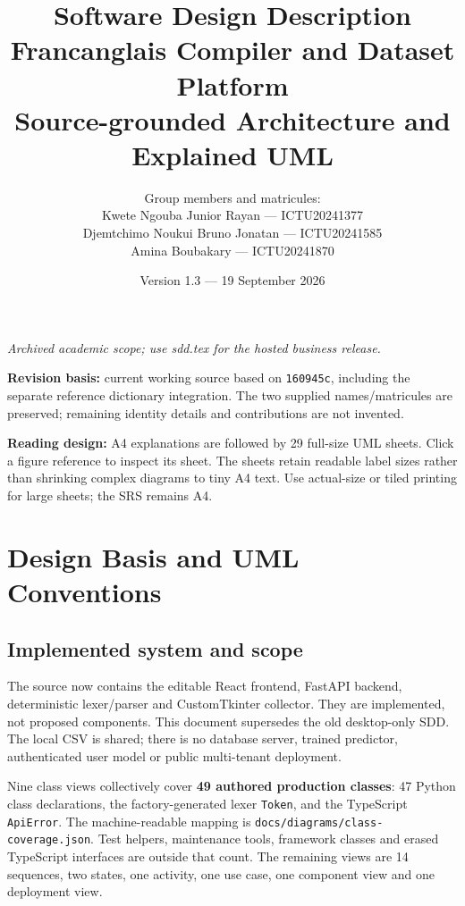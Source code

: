 \documentclass[11pt,a4paper]{article}
\title{\textbf{Software Design Description}\\[0.4em]
\Large Francanglais Compiler and Dataset Platform\\[0.6em]
\large Source-grounded Architecture and Explained UML}
\author{Group members and matricules:\\[0.6em]
Kwete Ngouba Junior Rayan --- ICTU20241377\\[0.5em]
Djemtchimo Noukui Bruno Jonatan --- ICTU20241585\\[0.5em]
Amina Boubakary --- ICTU20241870}
\date{Version 1.3 --- 19 September 2026}
\begin{document}
\maketitle\thispagestyle{empty}
\begin{center}\textit{Archived academic scope; use sdd.tex for the hosted business release.}\end{center}
\vfill
\noindent\textbf{Revision basis:} current working source based on
\nolinkurl{160945c}, including the separate reference dictionary integration.
The two supplied names/matricules are preserved; remaining identity details
and contributions are not invented.
\par\medskip
\noindent\textbf{Reading design:} A4 explanations are followed by 29 full-size
UML sheets. Click a figure reference to inspect its sheet. The sheets retain
readable label sizes rather than shrinking complex diagrams to tiny A4 text.
Use actual-size or tiled printing for large sheets; the SRS remains A4.
\newpage\tableofcontents\newpage\listoffigures\newpage

\section{Design Basis and UML Conventions}
\subsection{Implemented system and scope}
The source now contains the editable React frontend, FastAPI backend,
deterministic lexer/parser and CustomTkinter collector. They are implemented,
not proposed components. This document supersedes the old desktop-only SDD.
The local CSV is shared; there is no database server, trained predictor,
authenticated user model or public multi-tenant deployment.

Nine class views collectively cover \textbf{49 authored production classes}:
47 Python class declarations, the factory-generated lexer \texttt{Token}, and
the TypeScript \texttt{ApiError}. The machine-readable mapping is
\nolinkurl{docs/diagrams/class-coverage.json}. Test helpers, maintenance tools,
framework classes and erased TypeScript interfaces are outside that count.
The remaining views are 14 sequences, two states, one activity, one use case,
one component view and one deployment view.
\end{document}
